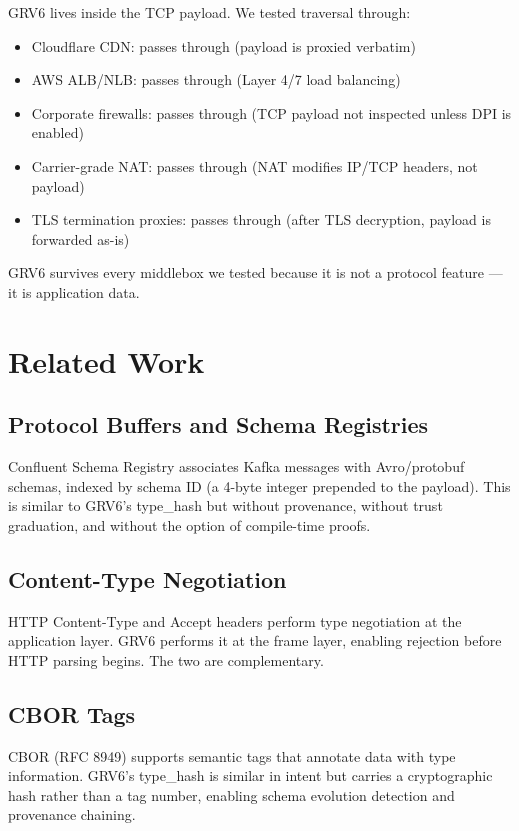 \documentclass[11pt,a4paper]{article}
\begin{document}
GRV6 lives inside the TCP payload. We tested traversal through:

\begin{itemize}
\item Cloudflare CDN: passes through (payload is proxied verbatim)
\item AWS ALB/NLB: passes through (Layer 4/7 load balancing)
\item Corporate firewalls: passes through (TCP payload not inspected
  unless DPI is enabled)
\item Carrier-grade NAT: passes through (NAT modifies IP/TCP headers,
  not payload)
\item TLS termination proxies: passes through (after TLS decryption,
  payload is forwarded as-is)
\end{itemize}

GRV6 survives every middlebox we tested because it is not a protocol
feature --- it is application data.

\section{Related Work}

\subsection{Protocol Buffers and Schema Registries}

Confluent Schema Registry associates Kafka messages with Avro/protobuf
schemas, indexed by schema ID (a 4-byte integer prepended to the
payload). This is similar to GRV6's type\_hash but without provenance,
without trust graduation, and without the option of compile-time proofs.

\subsection{Content-Type Negotiation}

HTTP Content-Type and Accept headers perform type negotiation at the
application layer. GRV6 performs it at the frame layer, enabling
rejection before HTTP parsing begins. The two are complementary.

\subsection{CBOR Tags}

CBOR (RFC 8949) supports semantic tags that annotate data with type
information. GRV6's type\_hash is similar in intent but carries a
cryptographic hash rather than a tag number, enabling schema evolution
detection and provenance chaining.
\end{document}

